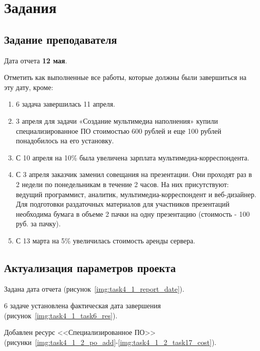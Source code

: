 \chapter{Задания}

\section*{Задание преподавателя}

Дата отчета \textbf{12 мая}.

Отметить как выполненные все работы, которые должны были завершиться на эту дату, кроме:
\begin{enumerate}
	\item 6 задача завершилась 11 апреля.
	\item 3 апреля для задачи «Создание мультимедиа наполнения» купили специализированное ПО 
	стоимостью 600 рублей и еще 100 рублей понадобилось на его установку.
	\item С 10 апреля на 10\% была увеличена зарплата мультимедиа-корреспондента.
	\item С 3 апреля заказчик заменил совещания на презентации. Они проходят раз в 2 недели 
	по понедельникам в течение 2 часов. На них присутствуют: ведущий программист, аналитик, 
	мультимедиа-корреспондент и веб-дизайнер. Для подготовки раздаточных материалов для 
	участников презентаций необходима бумага в объеме 2 пачки на одну презентацию 
	(стоимость - 100 руб. за пачку).
	\item С 13 марта на 5\% увеличилась стоимость аренды сервера.
\end{enumerate}


\section{Актуализация параметров проекта}

Задана дата отчета (рисунок~\ref{img:task4_1_report_date}).

6 задаче установлена фактическая дата завершения (рисунок~\ref{img:task4_1_task6_res}).

\newpage
Добавлен ресурс <<Специализированное ПО>> (рисунки~\ref{img:task4_1_2_po_add}-\ref{img:task4_1_2_task17_cost}).

